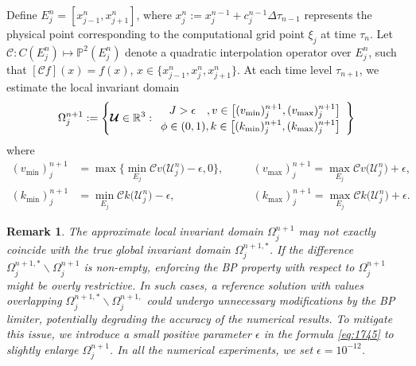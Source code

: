 \documentclass[times,final,11pt]{elsarticle}
\newtheorem{remark}{Remark}[section]
\numberwithin{equation}{section}
\theoremstyle{definition}
\theoremstyle{remark}
\begin{document}
Define $E_j^n = [x_{j - 1}^n, x_{j + 1}^n]$, where $x_j^n := x_j^{n - 1} + c_j^{n - 1} \Delta \tau_{n - 1}$ represents the physical point corresponding to the computational grid point $\xi_j$ at time $\tau_n$. Let $\mathcal{C}: C(E_j^n) \mapsto \mathbb{P}^2(E_j^n)$ denote a quadratic interpolation operator over $E_j^n$, such that $[\mathcal{C}f](x) = f(x)$, $x \in \big\{x_{j-1}^n,x_{j}^n,x_{j+1}^n\big\}$.
At each time level $\tau_{n + 1}$, we estimate the local invariant domain
\begin{equation}\label{eq:1795}
	\Omega^{n + 1}_j :=
	\left\{
	\boldsymbol{\mathcal{U}} \in \mathbb{R}^3
	:
	\renewcommand\arraystretch{1.2}
	\begin{array}{r}
		J > \epsilon \quad, v \in \left[ (v_{\min})^{n + 1}_j, (v_{\max})^{n + 1}_j \right] \\
		\phi \in (0, 1),	k \in \left[ (k_{\min})^{n + 1}_j, (k_{\max})^{n + 1}_j  \right]
	\end{array}
	\right\}
\end{equation}
where
\begin{equation}
\label{eq:1745}
	\begin{aligned}
		(v_{\min})^{n + 1}_{j} &= \max\big\{\min\limits_{E_j} \mathcal{C} v\big(\boldsymbol{\mathcal{U}}_j^{n}\big) - \epsilon, 0 \big\}, \quad &&(v_{\max})^{n + 1}_{j} = \max\limits_{E_j} \mathcal{C} v\big(\boldsymbol{\mathcal{U}}_j^{n}\big) + \epsilon, \\
		(k_{\min})^{n + 1}_{j} &= \min\limits_{E_j} \mathcal{C} k\big(\boldsymbol{\mathcal{U}}_j^{n}\big) - \epsilon, \quad &&(k_{\max})^{n + 1}_{j} = \max\limits_{E_j} \mathcal{C} k\big(\boldsymbol{\mathcal{U}}_j^{n}\big)+ \epsilon. 
	\end{aligned}
\end{equation}
\begin{remark}
	The approximate local invariant domain $\Omega_j^{n+1}$ may not exactly coincide with the true global invariant domain $\Omega_j^{n+1,*}$. If the difference $\Omega_j^{n+1,*} \backslash \Omega_j^{n+1}$ is non-empty, enforcing the BP property with respect to $\Omega_j^{n+1}$ might be overly restrictive. In such cases, a reference solution with values overlapping $\Omega_j^{n+1,*} \backslash \Omega_j^{n+1,}$ could undergo unnecessary modifications by the BP limiter, potentially degrading the accuracy of the numerical results. To mitigate this issue, we introduce a small positive parameter $\epsilon$ in the formula \eqref{eq:1745} to slightly enlarge $\Omega_j^{n+1}$. In all the numerical experiments, we set $\epsilon = 10^{-12}$.
\end{remark}
\end{document}
